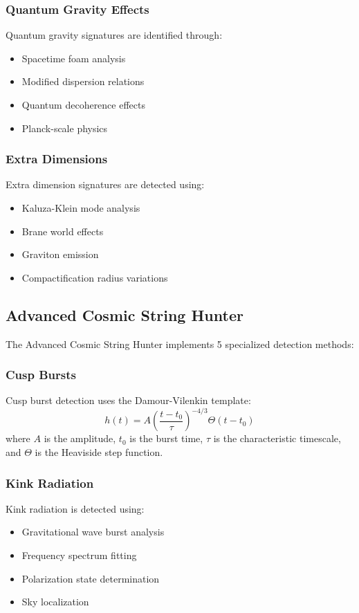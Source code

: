 \subsubsection{Quantum Gravity Effects}
Quantum gravity signatures are identified through:
\begin{itemize}
    \item Spacetime foam analysis
    \item Modified dispersion relations
    \item Quantum decoherence effects
    \item Planck-scale physics
\end{itemize}

\subsubsection{Extra Dimensions}
Extra dimension signatures are detected using:
\begin{itemize}
    \item Kaluza-Klein mode analysis
    \item Brane world effects
    \item Graviton emission
    \item Compactification radius variations
\end{itemize}

\subsection{Advanced Cosmic String Hunter}

The Advanced Cosmic String Hunter implements 5 specialized detection methods:

\subsubsection{Cusp Bursts}
Cusp burst detection uses the Damour-Vilenkin template:
\begin{equation}
h(t) = A \left(\frac{t-t_0}{\tau}\right)^{-4/3} \Theta(t-t_0)
\end{equation}
where $A$ is the amplitude, $t_0$ is the burst time, $\tau$ is the characteristic timescale, and $\Theta$ is the Heaviside step function.

\subsubsection{Kink Radiation}
Kink radiation is detected using:
\begin{itemize}
    \item Gravitational wave burst analysis
    \item Frequency spectrum fitting
    \item Polarization state determination
    \item Sky localization
\end{itemize}

